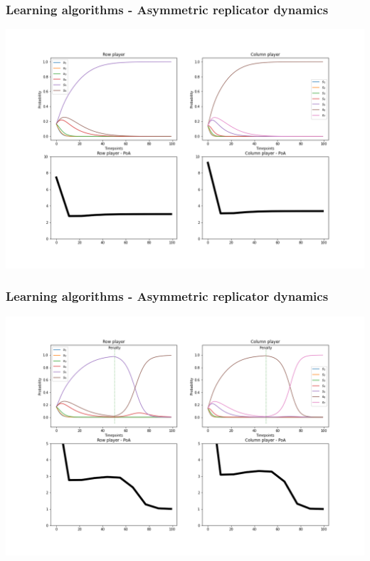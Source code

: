 \begin{frame}
    \frametitle{Learning algorithms - Asymmetric replicator dynamics}

    \includegraphics[scale=0.28]{Bin/ARD_game.png}
    
\end{frame}


\begin{frame}
    \frametitle{Learning algorithms - Asymmetric replicator dynamics}

    \includegraphics[scale=0.28]{Bin/ARD_penalty_game.png}
    
\end{frame}